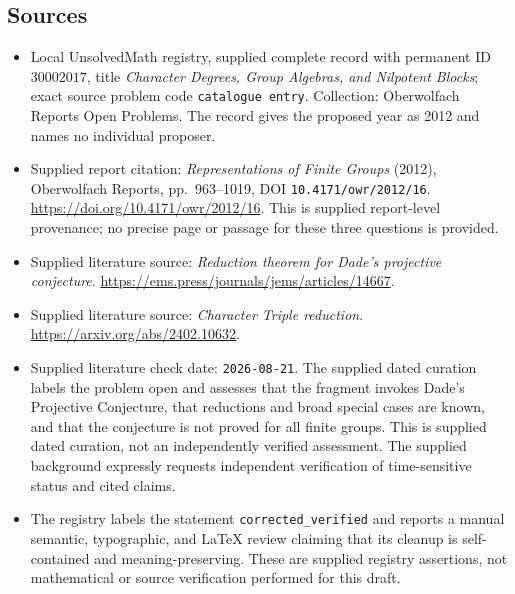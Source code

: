 \documentclass[11pt]{article}
\begin{document}
\subsection{Sources}
\begin{itemize}
\item Local UnsolvedMath registry, supplied complete record with permanent ID \(30002017\), title \emph{Character Degrees, Group Algebras, and Nilpotent Blocks}; exact source problem code \texttt{catalogue entry}. Collection: Oberwolfach Reports Open Problems. The record gives the proposed year as 2012 and names no individual proposer.
\item Supplied report citation: \emph{Representations of Finite Groups} (2012), Oberwolfach Reports, pp.~963--1019, DOI \texttt{10.4171/owr/2012/16}. \url{https://doi.org/10.4171/owr/2012/16}. This is supplied report-level provenance; no precise page or passage for these three questions is provided.
\item Supplied literature source: \emph{Reduction theorem for Dade's projective conjecture}. \url{https://ems.press/journals/jems/articles/14667}.
\item Supplied literature source: \emph{Character Triple reduction}. \url{https://arxiv.org/abs/2402.10632}.
\item Supplied literature check date: \texttt{2026-08-21}. The supplied dated curation labels the problem open and assesses that the fragment invokes Dade's Projective Conjecture, that reductions and broad special cases are known, and that the conjecture is not proved for all finite groups. This is supplied dated curation, not an independently verified assessment. The supplied background expressly requests independent verification of time-sensitive status and cited claims.
\item The registry labels the statement \texttt{corrected\_verified} and reports a manual semantic, typographic, and LaTeX review claiming that its cleanup is self-contained and meaning-preserving. These are supplied registry assertions, not mathematical or source verification performed for this draft.
\end{itemize}
\end{document}
